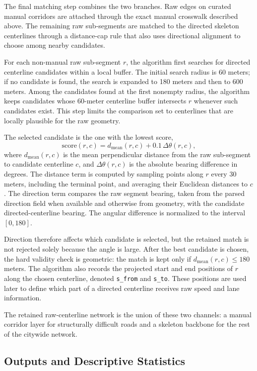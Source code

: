\documentclass[12pt]{article}
\begin{document}
	The final matching step combines the two branches. Raw edges on curated manual corridors are attached through the exact manual crosswalk described above. The remaining raw sub-segments are matched to the directed skeleton centerlines through a distance-cap rule that also uses directional alignment to choose among nearby candidates.
	
	For each non-manual raw sub-segment $r$, the algorithm first searches for directed centerline candidates within a local buffer. The initial search radius is 60 meters; if no candidate is found, the search is expanded to 180 meters and then to 600 meters. Among the candidates found at the first nonempty radius, the algorithm keeps candidates whose 60-meter centerline buffer intersects $r$ whenever such candidates exist. This step limits the comparison set to centerlines that are locally plausible for the raw geometry.
	
	The selected candidate is the one with the lowest score,
	\[
		\text{score}(r,c)=d_{\text{mean}}(r,c)+0.1\,\Delta\theta(r,c),
	\]
	where $d_{\text{mean}}(r,c)$ is the mean perpendicular distance from the raw sub-segment to candidate centerline $c$, and $\Delta\theta(r,c)$ is the absolute bearing difference in degrees. The distance term is computed by sampling points along $r$ every 30 meters, including the terminal point, and averaging their Euclidean distances to $c$. The direction term compares the raw segment bearing, taken from the parsed direction field when available and otherwise from geometry, with the candidate directed-centerline bearing. The angular difference is normalized to the interval $[0,180]$.
	
	Direction therefore affects which candidate is selected, but the retained match is not rejected solely because the angle is large. After the best candidate is chosen, the hard validity check is geometric: the match is kept only if $d_{\text{mean}}(r,c) \leq 180$ meters. The algorithm also records the projected start and end positions of $r$ along the chosen centerline, denoted \texttt{s\_from} and \texttt{s\_to}. These positions are used later to define which part of a directed centerline receives raw speed and lane information.
	
	The retained raw-centerline network is the union of these two channels: a manual corridor layer for structurally difficult roads and a skeleton backbone for the rest of the citywide network.
	
	\subsection{Outputs and Descriptive Statistics}
	
\end{document}
